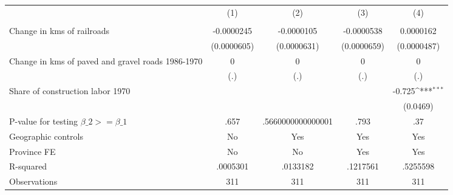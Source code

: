 {
\def\sym#1{\ifmmode^{#1}\else\(^{#1}\)\fi}
\begin{tabular}{l*{4}{c}}
\hline\hline
                &\multicolumn{1}{c}{(1)}&\multicolumn{1}{c}{(2)}&\multicolumn{1}{c}{(3)}&\multicolumn{1}{c}{(4)}\\
                &\multicolumn{1}{c}{}&\multicolumn{1}{c}{}&\multicolumn{1}{c}{}&\multicolumn{1}{c}{}\\
\hline
Change in kms of railroads&-0.0000245         &-0.0000105         &-0.0000538         &0.0000162         \\
                &(0.0000605)         &(0.0000631)         &(0.0000659)         &(0.0000487)         \\
[1em]
Change in kms of paved and gravel roads 1986-1970&        0         &        0         &        0         &        0         \\
                &      (.)         &      (.)         &      (.)         &      (.)         \\
[1em]
Share of construction labor 1970&                  &                  &                  &   -0.725\sym{***}\\
                &                  &                  &                  & (0.0469)         \\
\hline
P-value for testing $\beta\_{2} >= \beta\_{1}$&     .657         &.5660000000000001         &     .793         &      .37         \\
Geographic controls&       No         &      Yes         &      Yes         &      Yes         \\
Province FE     &       No         &       No         &      Yes         &      Yes         \\
R-squared       & .0005301         & .0133182         & .1217561         & .5255598         \\
Observations    &      311         &      311         &      311         &      311         \\
\hline\hline
\end{tabular}
}
